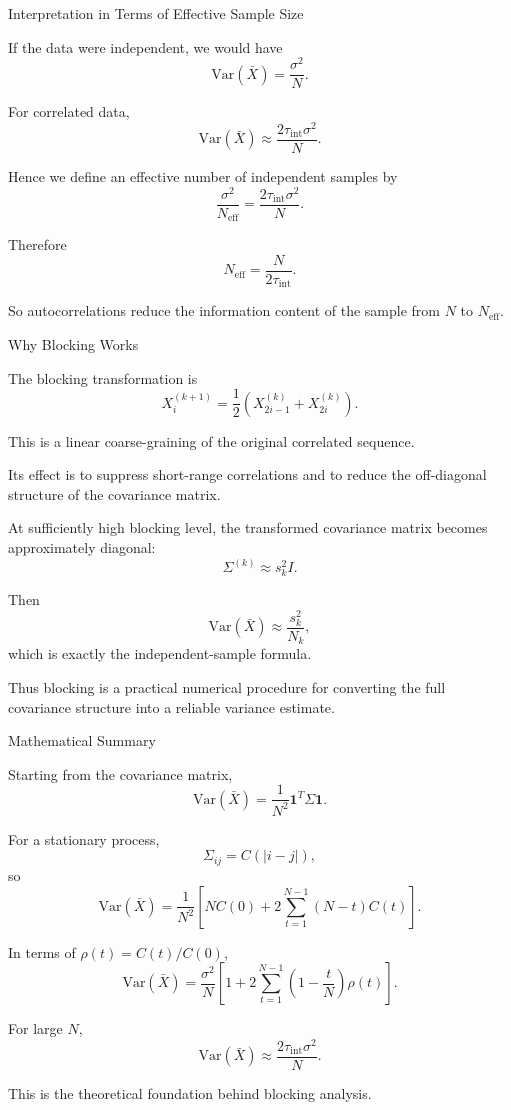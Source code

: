 \documentclass{beamer}
\begin{document}
\begin{frame}{Interpretation in Terms of Effective Sample Size}

If the data were independent, we would have
\[
\mathrm{Var}(\bar X)=\frac{\sigma^2}{N}.
\]

For correlated data,
\[
\mathrm{Var}(\bar X)\approx \frac{2\tau_{\mathrm{int}}\sigma^2}{N}.
\]

Hence we define an effective number of independent samples by
\[
\frac{\sigma^2}{N_{\mathrm{eff}}}
=
\frac{2\tau_{\mathrm{int}}\sigma^2}{N}.
\]

Therefore
\[
N_{\mathrm{eff}}=\frac{N}{2\tau_{\mathrm{int}}}.
\]

So autocorrelations reduce the information content of the sample from $N$ to $N_{\mathrm{eff}}$.
\end{frame}

\begin{frame}{Why Blocking Works}

The blocking transformation is
\[
X_i^{(k+1)}=\frac{1}{2}\left(X_{2i-1}^{(k)}+X_{2i}^{(k)}\right).
\]

This is a linear coarse-graining of the original correlated sequence.

Its effect is to suppress short-range correlations and to reduce the off-diagonal structure of the covariance matrix.

At sufficiently high blocking level, the transformed covariance matrix becomes approximately diagonal:
\[
\Sigma^{(k)} \approx s_k^2 I.
\]

Then
\[
\mathrm{Var}(\bar X)
\approx \frac{s_k^2}{N_k},
\]
which is exactly the independent-sample formula.

Thus blocking is a practical numerical procedure for converting the full covariance structure into a reliable variance estimate.
\end{frame}

\begin{frame}{Mathematical Summary}

Starting from the covariance matrix,
\[
\mathrm{Var}(\bar X)=\frac{1}{N^2}\bm{1}^T\Sigma\bm{1}.
\]

For a stationary process,
\[
\Sigma_{ij}=C(|i-j|),
\]
so
\[
\mathrm{Var}(\bar X)
=
\frac{1}{N^2}
\left[
N C(0)+2\sum_{t=1}^{N-1}(N-t)C(t)
\right].
\]

In terms of $\rho(t)=C(t)/C(0)$,
\[
\mathrm{Var}(\bar X)
=
\frac{\sigma^2}{N}
\left[
1+2\sum_{t=1}^{N-1}\left(1-\frac{t}{N}\right)\rho(t)
\right].
\]

For large $N$,
\[
\mathrm{Var}(\bar X)\approx \frac{2\tau_{\mathrm{int}}\sigma^2}{N}.
\]

This is the theoretical foundation behind blocking analysis.
\end{frame}
\end{document}
